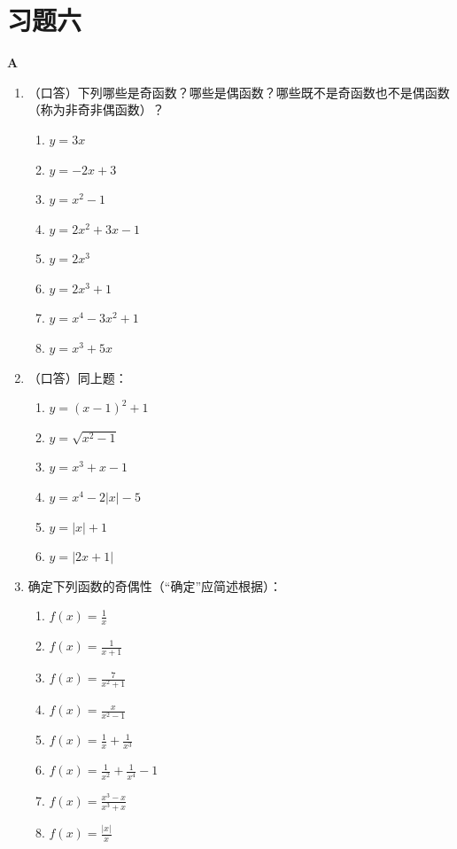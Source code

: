 \section*{习题六}
\begin{center}
    \bfseries A
\end{center}
\begin{enumerate}
    \item （口答）下列哪些是奇函数？哪些是偶函数？哪些既不是奇函数也不是偶函数（称为非奇非偶函数）？
\begin{multicols}{2}
\begin{enumerate}[(1)]
    \item $y=3x$
    \item $y=-2x+3$
    \item $y=x^2-1$
    \item $y=2x^2+3x-1$
    \item $y=2x^3$
    \item $y=2x^3+1$
    \item $y=x^4-3x^2+1$
    \item $y=x^3+5x$
\end{enumerate}
\end{multicols}
  \item   （口答）同上题：
\begin{multicols}{2}
\begin{enumerate}[(1)]
    \item $y=(x-1)^2+1$
    \item $y=\sqrt{x^2-1}$
    \item $y=x^3+x-1$
    \item $y=x^4-2|x|-5$
    \item $y=|x|+1$
    \item $y=|2x+1|$
\end{enumerate}
\end{multicols}

\item     确定下列函数的奇偶性（“确定”应简述根据）：
\begin{multicols}{2}
\begin{enumerate}[(1)]
    \item $f(x)=\frac{1}{x}$
    \item $f(x)=\frac{1}{x+1}$
    \item $f(x)=\frac{7}{x^2+1}$
    \item $f(x)=\frac{x}{x^2-1}$
    \item $f(x)=\frac{1}{x}+\frac{1}{x^3}$
    \item $f(x)=\frac{1}{x^2}+\frac{1}{x^4}-1$
    \item $f(x)=\frac{x^3-x}{x^3+x}$
    \item $f(x)=\frac{|x|}{x}$
\end{enumerate}
\end{multicols}
\end{enumerate}

